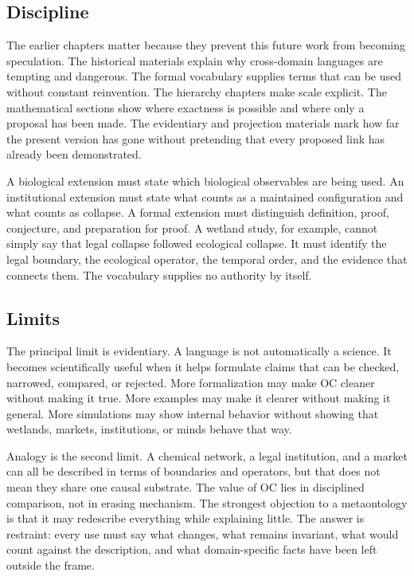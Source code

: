 \documentclass[11pt,a4paper,openany]{book}
\begin{document}
\subsection{Discipline}
The earlier chapters matter because they prevent this future work from becoming speculation. The historical materials explain why cross-domain languages are tempting and dangerous. The formal vocabulary supplies terms that can be used without constant reinvention. The hierarchy chapters make scale explicit. The mathematical sections show where exactness is possible and where only a proposal has been made. The evidentiary and projection materials mark how far the present version has gone without pretending that every proposed link has already been demonstrated. \cite{haken_synergetics,nicolis_prigogine_selforg}\par
A biological extension must state which biological observables are being used. An institutional extension must state what counts as a maintained configuration and what counts as collapse. A formal extension must distinguish definition, proof, conjecture, and preparation for proof. A wetland study, for example, cannot simply say that legal collapse followed ecological collapse. It must identify the legal boundary, the ecological operator, the temporal order, and the evidence that connects them. The vocabulary supplies no authority by itself.\par
\subsection{Limits}
The principal limit is evidentiary. A language is not automatically a science. It becomes scientifically useful when it helps formulate claims that can be checked, narrowed, compared, or rejected. More formalization may make OC cleaner without making it true. More examples may make it clearer without making it general. More simulations may show internal behavior without showing that wetlands, markets, institutions, or minds behave that way. \cite{haken_synergetics,nicolis_prigogine_selforg}\par
Analogy is the second limit. A chemical network, a legal institution, and a market can all be described in terms of boundaries and operators, but that does not mean they share one causal substrate. The value of OC lies in disciplined comparison, not in erasing mechanism. The strongest objection to a metaontology is that it may redescribe everything while explaining little. The answer is restraint: every use must say what changes, what remains invariant, what would count against the description, and what domain-specific facts have been left outside the frame.\par
\end{document}
